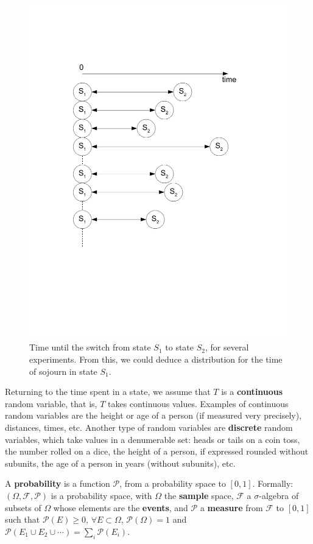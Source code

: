 \begin{figure}[htbp]
\begin{center}
\includegraphics[height=0.45\textwidth]
{../figs_03_residence_time/random_length_sample}
\caption{Time until the switch from state $S_1$ to state $S_2$, for several experiments. From this, we could deduce a distribution for the time of sojourn in state $S_1$.}
\end{center}
\end{figure}

Returning to the time spent in a state, we assume that $T$ is a \textbf{continuous} random variable, that is, $T$ takes continuous values. Examples of continuous random variables are the height or age of a person (if measured very precisely), distances, times, etc.
Another type of random variables are \textbf{discrete} random variables, which take values in a denumerable set: heads or tails on a coin toss, the number rolled on a dice, the height of a person, if expressed rounded without subunits, the age of a person in years (without subunits), etc.

A \textbf{probability} is a function $\mathcal{P}$, from a probability space to $[0,1]$.
Formally: $(\Omega,\mathcal{F},\mathcal{P})$ is a probability space, with $\Omega$ the \textbf{sample} space, $\mathcal{F}$ a $\sigma$-algebra of subsets of $\Omega$ whose elements are the \textbf{events}, and $\mathcal{P}$ a \textbf{measure} from $\mathcal{F}$ to $[0,1]$ such that $\mathcal{P}(E)\geq 0$, $\forall E\subset\Omega$, $\mathcal{P}(\Omega)=1$ and $\mathcal{P}(E_1\cup E_2\cup\cdots)=\sum_i\mathcal{P}(E_i)$.

